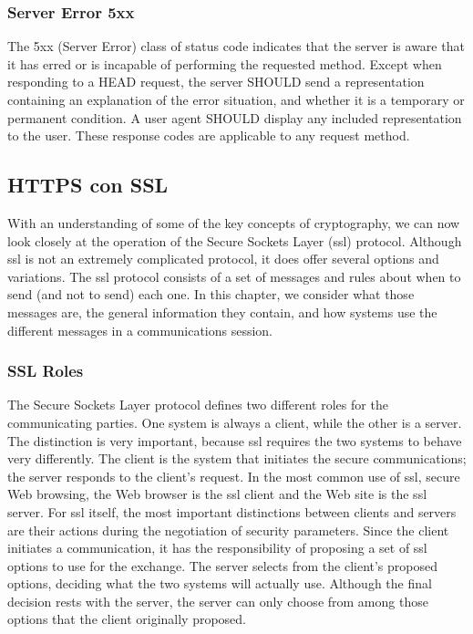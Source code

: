 \subsubsection*{Server Error 5xx}

   The 5xx (Server Error) class of status code indicates that the server
   is aware that it has erred or is incapable of performing the
   requested method.  Except when responding to a HEAD request, the
   server SHOULD send a representation containing an explanation of the
   error situation, and whether it is a temporary or permanent   condition.  A user agent SHOULD display any included representation
   to the user.  These response codes are applicable to any request
   method.

  

\subsection{HTTPS con SSL} 

With an understanding of some of the key concepts of cryptography,
we can now look closely at the operation of the Secure Sockets Layer
(ssl) protocol. Although ssl is not an extremely complicated protocol, 
it does offer several options and variations. 
The ssl protocol consists of a set of messages and rules about when
to send (and not to send) each one. In this chapter, we consider what
those messages are, the general information they contain, and how
systems use the different messages in a communications session. 

\subsubsection*{SSL Roles}
The Secure Sockets Layer protocol defines two different roles for the
communicating parties. One system is always a client, while the other
is a server. The distinction is very important, because ssl requires the
two systems to behave very differently. The client is the system that
initiates the secure communications; the server responds to the client’s request. 
In the most common use of ssl, secure Web browsing,
the Web browser is the ssl client and the Web site is the ssl server.
For ssl itself, the most important distinctions between clients and
servers are their actions during the negotiation of security parameters. 
Since the client initiates a communication, it has the
responsibility of proposing a set of ssl options to use for the
exchange. The server selects from the client’s proposed options,
deciding what the two systems will actually use. Although the final
decision rests with the server, the server can only choose from among
those options that the client originally proposed.

